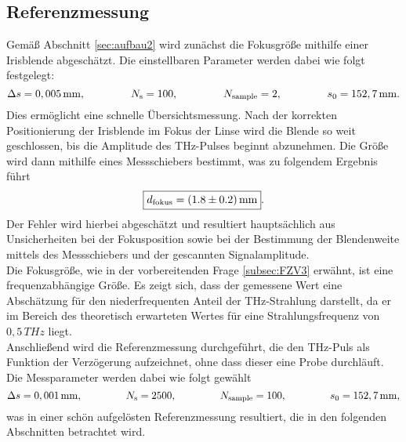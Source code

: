\subsection{\label{sec:A21}Referenzmessung}
Gemäß Abschnitt \ref{sec:aufbau2} wird zunächst die Fokusgröße mithilfe einer Irisblende abgeschätzt. 
Die einstellbaren Parameter werden dabei wie folgt festgelegt:
\begin{equation}
    \Delta s = 0,005\,\si{mm}, \hspace{1.5cm} N_{\text{s}} = 100, \hspace{1.5cm} N_{\text{sample}} = 2, \hspace{1.5cm} s_{0} = 152,7\,\si{mm}. 
\end{equation}
Dies ermöglicht eine schnelle Übersichtsmessung. 
Nach der korrekten Positionierung der Irisblende im Fokus der Linse wird die Blende 
so weit geschlossen, bis die Amplitude des THz-Pulses beginnt abzunehmen. 
Die Größe wird dann mithilfe eines Messschiebers bestimmt, was zu folgendem Ergebnis führt
\begin{equation}
    \fbox{$d_{\text{fokus}} = (1.8 \pm 0.2)\,\si{mm}$}.
\end{equation}
Der Fehler wird hierbei abgeschätzt und resultiert hauptsächlich 
aus Unsicherheiten bei der Fokusposition sowie bei der Bestimmung der Blendenweite 
mittels des Messschiebers und der gescannten Signalamplitude. \\
Die Fokusgröße, wie in der vorbereitenden Frage \ref{subsec:FZV3} erwähnt, 
ist eine frequenzabhängige Größe. 
Es zeigt sich, dass der gemessene Wert eine Abschätzung für den niederfrequenten
Anteil der THz-Strahlung darstellt, da er im Bereich des theoretisch erwarteten Wertes 
für eine Strahlungsfrequenz von $0,5\,\si{THz}$ liegt. \\
Anschließend wird die Referenzmessung durchgeführt, die den THz-Puls als Funktion 
der Verzögerung aufzeichnet, ohne dass dieser eine Probe durchläuft. 
Die Messparameter werden dabei wie folgt gewählt
\begin{equation}
    \Delta s = 0,001\,\si{mm}, \hspace{1.5cm} N_{\text{s}} = 2500, \hspace{1.5cm} N_{\text{sample}} = 100, \hspace{1.5cm} s_{0} = 152,7\,\si{mm}, 
\end{equation}
was in einer schön aufgelösten Referenzmessung resultiert, die in den folgenden 
Abschnitten betrachtet wird. \\